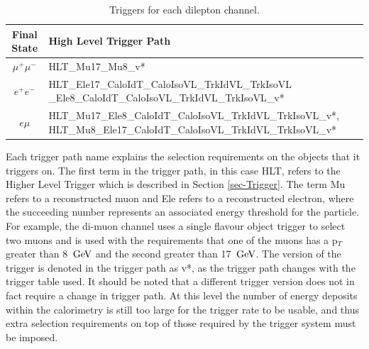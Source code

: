 \begin{table} 
\begin{center}
\begin{tabular}{|c|p{11.5cm}|}
\hline
	\textbf{Final State} & \textbf{High Level Trigger Path} \\
\hline
	$\mu^+\mu^-$ & HLT\_Mu17\_Mu8\_v* \\
	$e^+e^-$ & HLT\_Ele17\_CaloIdT\_CaloIsoVL\_TrkIdVL\_TrkIsoVL
				\_Ele8\_CaloIdT\_CaloIsoVL\_TrkIdVL\_TrkIsoVL\_v* \\
	$e\mu$ & HLT\_Mu17\_Ele8\_CaloIdT\_CaloIsoVL\_TrkIdVL\_TrkIsoVL\_v*, HLT\_Mu8\_Ele17\_CaloIdT\_CaloIsoVL\_TrkIdVL\_TrkIsoVL\_v* \\
\hline	
\end{tabular}
\end{center}
\caption{Triggers for each dilepton channel.}
\label{tab-HLTriggers}
\end{table}

Each trigger path name explains the selection requirements on the objects that it triggers on. The first term in the trigger path, in this case HLT, refers to the Higher Level Trigger which is described in Section \ref{sec-Trigger}. The term Mu refers to a reconstructed muon and Ele refers to a reconstructed electron, where the succeeding number represents an associated energy threshold for the particle. For example, the di-muon channel uses a single flavour object trigger to select two muons and is used with the requirements that one of the muons has a p$_T$ greater than 8 $\,\text{Ge\hspace{-.08em}V}$ and the second greater than 17 $\,\text{Ge\hspace{-.08em}V}$. The version of the trigger is denoted in the trigger path as v*, as the trigger path changes with the trigger table used. It should be noted that a different trigger version does not in fact require a change in trigger path. At this level the number of energy deposits within the calorimetry is still too large for the trigger rate to be usable, and thus extra selection requirements on top of those required by the trigger system must be imposed.

